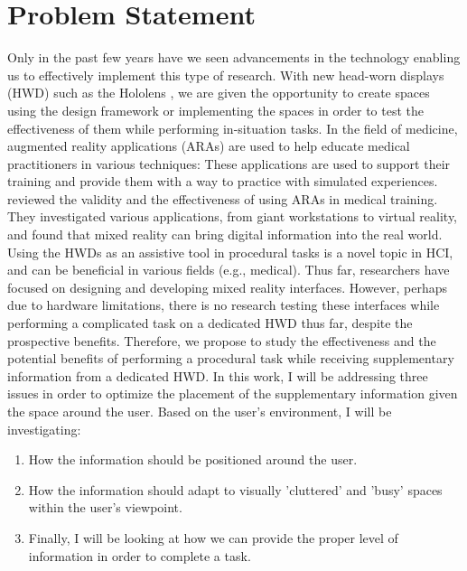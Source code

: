 \section{Problem Statement}
\label{sec:problemstatement}
Only in the past few years have we seen advancements in the technology enabling us to effectively implement this type of research. With new head-worn displays (HWD) such as the Hololens \cite{Hololens}, we are given the opportunity to create spaces using the design framework \cite{Ens2014a} or implementing the spaces in order to test the effectiveness of them while performing in-situation tasks.
In the field of medicine, augmented reality applications (ARAs) are used to help educate medical practitioners in various techniques: These applications are used to support their training and provide them with a way to practice with simulated experiences. \cite{Barsom2016} reviewed the validity and the effectiveness of using ARAs in medical training. They investigated various applications, from giant workstations to virtual reality, and found that mixed reality can bring digital information into the real world. Using the HWDs as an assistive tool in procedural tasks is a novel topic in HCI, and can be beneficial in various fields (e.g., medical). Thus far, researchers have focused on designing and developing mixed reality interfaces. However, perhaps due to hardware limitations, there is no research testing these interfaces while performing a complicated task on a dedicated HWD thus far, despite the prospective benefits. Therefore, we propose to study the effectiveness and the potential benefits of performing a procedural task while receiving supplementary information from a dedicated HWD. 
In this work, I will be addressing three issues in order to optimize the placement of the supplementary information given the space around the user. Based on the user's environment, I will be investigating:
\begin{enumerate}
	\item How the information should be positioned around the user.
	\item How the information should adapt to visually 'cluttered' and 'busy' spaces within the user's viewpoint.
	\item Finally, I will be looking at how we can provide the proper level of information in order to complete a task.
\end{enumerate}